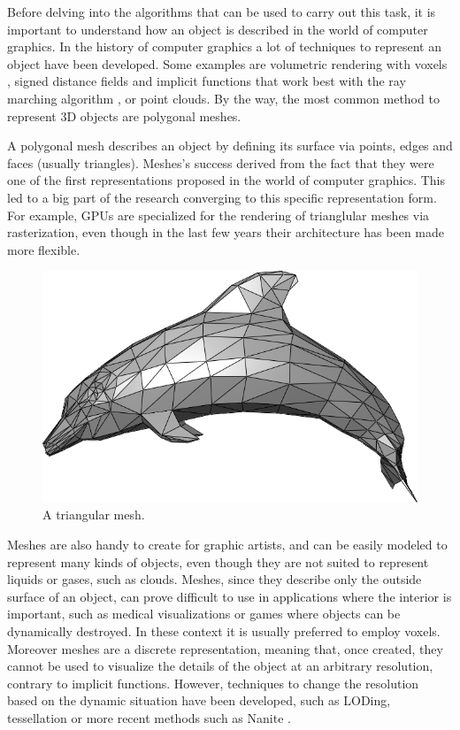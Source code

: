 \documentclass{PoliMi_MasterThesis}
\begin{document}
Before delving into the algorithms that can be used to carry out this task, it is important to understand how an object is described in the world of computer graphics. In the history of computer graphics a lot of techniques to represent an object have been developed. Some examples are volumetric rendering with voxels \cite{voxel_rendering}, signed distance fields \cite{sdf} and implicit functions that work best with the ray marching algorithm \cite{ray_marching}, or point clouds. By the way, the most common method to represent 3D objects are polygonal meshes.

A polygonal mesh describes an object by defining its surface via points, edges and faces (usually triangles). Meshes's success derived from the fact that they were one of the first representations proposed in the world of computer graphics. This led to a big part of the research converging to this specific representation form. For example, GPUs are specialized for the rendering of trianglular meshes via rasterization, even though in the last few years their architecture has been made more flexible.

\begin{figure}[H]
    \centering
    \includegraphics[width=\textwidth*\real{0.7}]{Images/triangular_mesh.png}
    \caption{A triangular mesh.}
    \label{fig:triangular_mesh}
\end{figure}

Meshes are also handy to create for graphic artists, and can be easily modeled to represent many kinds of objects, even though they are not suited to represent liquids or gases, such as clouds. Meshes, since they describe only the outside surface of an object, can prove difficult to use in applications where the interior is important, such as medical visualizations or games where objects can be dynamically destroyed. In these context it is usually preferred to employ voxels. Moreover meshes are a discrete representation, meaning that, once created, they cannot be used to visualize the details of the object at an arbitrary resolution, contrary to implicit functions. However, techniques to change the resolution based on the dynamic situation have been developed, such as LODing, tessellation \cite{tessellation} or more recent methods such as Nanite \cite{nanite}.
\end{document}
